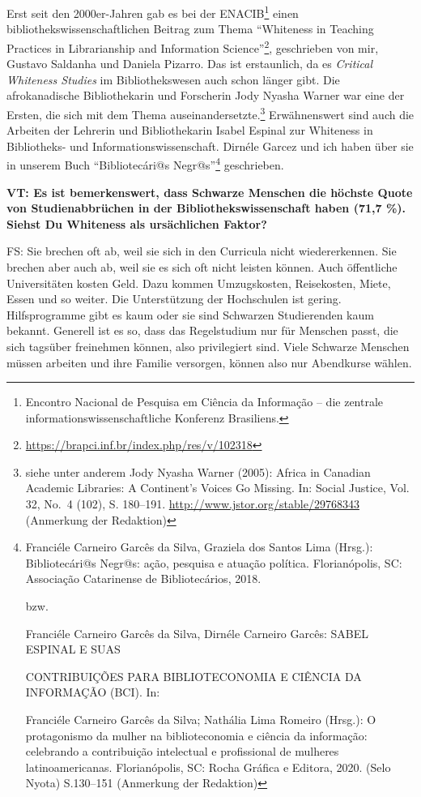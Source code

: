 \documentclass[a4paper,
fontsize=11pt,
oneside,
numbers=noperiodatend,
parskip=half-,
bibliography=totoc,
final
]{scrartcl}
\begin{document}
Erst seit den 2000er-Jahren gab es bei der ENACIB\footnote{Encontro
  Nacional de Pesquisa em Ciência da Informação -- die zentrale
  informationswissenschaftliche Konferenz Brasiliens.} einen
bibliothekswissenschaftlichen Beitrag zum Thema \enquote{Whiteness in Teaching
Practices in Librarianship and Information Science}\footnote{\url{https://brapci.inf.br/index.php/res/v/102318}},
geschrieben von mir, Gustavo Saldanha und Daniela Pizarro. Das ist
erstaunlich, da es \emph{Critical Whiteness Studies} im Bibliothekswesen
auch schon länger gibt. Die afrokanadische Bibliothekarin und Forscherin
Jody Nyasha Warner war eine der Ersten, die sich mit dem Thema
auseinandersetzte.\footnote{siehe unter anderem Jody Nyasha Warner
  (2005): Africa in Canadian Academic Libraries: A Continent's Voices Go
  Missing. In: Social Justice, Vol. 32, No.~4 (102), S. 180--191.
  \url{http://www.jstor.org/stable/29768343} (Anmerkung der Redaktion)}
Erwähnenswert sind auch die Arbeiten der Lehrerin und Bibliothekarin
Isabel Espinal zur Whiteness in Bibliotheks- und
Informationswissenschaft. Dirnéle Garcez und ich haben über sie in
unserem Buch \enquote{Bibliotecári@s Negr@s}\footnote{Franciéle Carneiro Garcês
  da Silva, Graziela dos Santos Lima (Hrsg.): Bibliotecári@s Negr@s:
  ação, pesquisa e atuação política. Florianópolis, SC: Associação
  Catarinense de Bibliotecários, 2018.

  bzw.

  Franciéle Carneiro Garcês da Silva, Dirnéle Carneiro Garcês: SABEL
  ESPINAL E SUAS

  CONTRIBUIÇÕES PARA BIBLIOTECONOMIA E CIÊNCIA DA INFORMAÇÃO (BCI). In:

  Franciéle Carneiro Garcês da Silva; Nathália Lima Romeiro (Hrsg.): O
  protagonismo da mulher na biblioteconomia e ciência da informação:
  celebrando a contribuição intelectual e profissional de mulheres
  latinoamericanas. Florianópolis, SC: Rocha Gráfica e Editora, 2020.
  (Selo Nyota) S.130--151 (Anmerkung der Redaktion)} geschrieben.

\textbf{VT: Es ist bemerkenswert, dass Schwarze Menschen die höchste
Quote von Studienabbrüchen in der Bibliothekswissenschaft haben (71,7
\%). Siehst Du Whiteness als ursächlichen Faktor?}

FS: Sie brechen oft ab, weil sie sich in den Curricula nicht
wiedererkennen. Sie brechen aber auch ab, weil sie es sich oft nicht
leisten können. Auch öffentliche Universitäten kosten Geld. Dazu kommen
Umzugskosten, Reisekosten, Miete, Essen und so weiter. Die Unterstützung
der Hochschulen ist gering. Hilfsprogramme gibt es kaum oder sie sind
Schwarzen Studierenden kaum bekannt. Generell ist es so, dass das
Regelstudium nur für Menschen passt, die sich tagsüber freinehmen
können, also privilegiert sind. Viele Schwarze Menschen müssen arbeiten
und ihre Familie versorgen, können also nur Abendkurse wählen.
\end{document}
